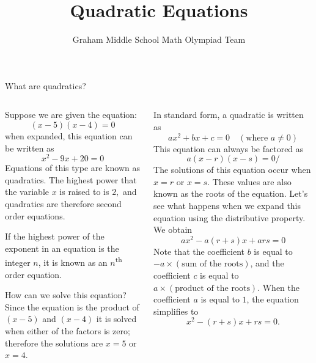 \documentclass[9pt,aspectratio=169]{beamer}
\title{Quadratic Equations}
\subtitle[Graham Middle School]{Graham Middle School Math Olympiad Team}
\begin{document}
\maketitle

\begin{frame}{What are quadratics?}
  \begin{columns}[T]
    \begin{column}{0.5\textwidth}
      Suppose we are given the equation:
      \[ (x-5)(x-4) = 0 \]
      when expanded, this equation can be written as
      \[ x^2 - 9x + 20 = 0 \]
      Equations of this type are known as quadratics.  The highest power that the variable $x$ is raised to is $2,$ and quadratics are therefore second order equations.  
      \begin{definition}
        If the highest power of the exponent in an equation is the integer $n$, it is known as an $n$\textsuperscript{th} order equation.          
      \end{definition}

      How can we solve this equation?  Since the equation is the product of $(x-5)$ and $(x-4)$ it is solved when either of the factors is zero; therefore the solutions are $x = 5$ or $x = 4$.  
    \end{column}
    \begin{column}{0.5\textwidth}
      In standard form, a quadratic is written as 
	    \[ ax^2 + bx + c = 0\quad (\text{where } a \neq 0)\]
      This equation can always be factored as
      \[ a(x - r)(x - s) = 0/ \]
      The solutions of this equation occur when $x = r$ or $x = s$.  These values are also known as the roots of the equation.  Let’s see what happens when we expand this equation using the distributive property.  We obtain
      \[ ax^2 - a(r + s)x + ars = 0 \]
      Note that the coefficient $b$ is equal to $-a\times(\text{sum of the roots})$, and the coefficient $c$ is equal to $a \times (\text{product of the roots})$.  When the coefficient $a$ is equal to $1$, the equation simplifies to
      \[ x^2 - (r + s)x + rs = 0. \]
    \end{column}
  \end{columns}
\end{frame}
\end{document}
